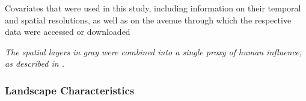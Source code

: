 \documentclass[abstract=on,10pt,a4paper,bibliography=totocnumbered]{article}
\begin{document}
\onehalfspacing
\begin{center}
\begin{threeparttable}
  \caption{Covariates that were used in this study, including information on
  their temporal and spatial resolutions, as well as on the avenue through which
  the respective data were accessed or downloaded}
  \label{Covariates}
  
  \begin{tablenotes}
    \item \textit{The spatial layers in gray were combined into a single proxy
    of human influence, as described in \citet{Hofmann.2021}.}
  \end{tablenotes}
\end{threeparttable}
\end{center}
\doublespacing

\subsubsection{Landscape Characteristics}
\end{document}
